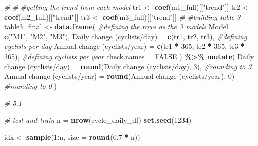 \documentclass[
]{article}
\newenvironment{Shaded}{\begin{snugshade}}{\end{snugshade}}
\newcommand{\AttributeTok}[1]{\textcolor[rgb]{0.13,0.29,0.53}{#1}}
\newcommand{\CommentTok}[1]{\textcolor[rgb]{0.56,0.35,0.01}{\textit{#1}}}
\newcommand{\ConstantTok}[1]{\textcolor[rgb]{0.56,0.35,0.01}{#1}}
\newcommand{\DecValTok}[1]{\textcolor[rgb]{0.00,0.00,0.81}{#1}}
\newcommand{\FloatTok}[1]{\textcolor[rgb]{0.00,0.00,0.81}{#1}}
\newcommand{\FunctionTok}[1]{\textcolor[rgb]{0.13,0.29,0.53}{\textbf{#1}}}
\newcommand{\NormalTok}[1]{#1}
\newcommand{\OtherTok}[1]{\textcolor[rgb]{0.56,0.35,0.01}{#1}}
\newcommand{\SpecialCharTok}[1]{\textcolor[rgb]{0.81,0.36,0.00}{\textbf{#1}}}
\newcommand{\StringTok}[1]{\textcolor[rgb]{0.31,0.60,0.02}{#1}}
\begin{document}
\begin{Shaded}
\begin{Highlighting}[]
\CommentTok{\# }
\CommentTok{\# \#getting the trend from each model}
\NormalTok{tr1 }\OtherTok{\textless{}{-}} \FunctionTok{coef}\NormalTok{(m1\_full)[[}\StringTok{"trend"}\NormalTok{]]}
\NormalTok{tr2 }\OtherTok{\textless{}{-}} \FunctionTok{coef}\NormalTok{(m2\_full)[[}\StringTok{"trend"}\NormalTok{]]}
\NormalTok{tr3 }\OtherTok{\textless{}{-}} \FunctionTok{coef}\NormalTok{(m3\_full)[[}\StringTok{"trend"}\NormalTok{]]}
\CommentTok{\# }
\CommentTok{\#building table 3}
\NormalTok{table3\_final }\OtherTok{\textless{}{-}} \FunctionTok{data.frame}\NormalTok{(}
  \CommentTok{\#defining the rows as the 3 models}
  \AttributeTok{Model =} \FunctionTok{c}\NormalTok{(}\StringTok{"M1"}\NormalTok{, }\StringTok{"M2"}\NormalTok{, }\StringTok{"M3"}\NormalTok{),}
  \StringTok{\textasciigrave{}}\AttributeTok{Daily change (cyclists/day)}\StringTok{\textasciigrave{}} \OtherTok{=} \FunctionTok{c}\NormalTok{(tr1, tr2, tr3), }\CommentTok{\#defining cyclists per day}
  \StringTok{\textasciigrave{}}\AttributeTok{Annual change (cyclists/year)}\StringTok{\textasciigrave{}} \OtherTok{=} \FunctionTok{c}\NormalTok{(tr1 }\SpecialCharTok{*} \DecValTok{365}\NormalTok{, tr2 }\SpecialCharTok{*} \DecValTok{365}\NormalTok{, tr3 }\SpecialCharTok{*} \DecValTok{365}\NormalTok{), }\CommentTok{\#defining cyclists per year}
  \AttributeTok{check.names =} \ConstantTok{FALSE}
\NormalTok{) }\SpecialCharTok{\%\textgreater{}\%}
  \FunctionTok{mutate}\NormalTok{(}
    \StringTok{\textasciigrave{}}\AttributeTok{Daily change (cyclists/day)}\StringTok{\textasciigrave{}} \OtherTok{=} \FunctionTok{round}\NormalTok{(}\StringTok{\textasciigrave{}}\AttributeTok{Daily change (cyclists/day)}\StringTok{\textasciigrave{}}\NormalTok{, }\DecValTok{3}\NormalTok{), }\CommentTok{\#rounding to 3}
    \StringTok{\textasciigrave{}}\AttributeTok{Annual change (cyclists/year)}\StringTok{\textasciigrave{}} \OtherTok{=} \FunctionTok{round}\NormalTok{(}\StringTok{\textasciigrave{}}\AttributeTok{Annual change (cyclists/year)}\StringTok{\textasciigrave{}}\NormalTok{, }\DecValTok{0}\NormalTok{) }\CommentTok{\#rounding to 0}
\NormalTok{  )}


\CommentTok{\# 5.1 }

\CommentTok{\# test and train}
\NormalTok{n }\OtherTok{=} \FunctionTok{nrow}\NormalTok{(cycle\_daily\_df)}
\FunctionTok{set.seed}\NormalTok{(}\DecValTok{1234}\NormalTok{)}

\NormalTok{idx }\OtherTok{\textless{}{-}} \FunctionTok{sample}\NormalTok{(}\DecValTok{1}\SpecialCharTok{:}\NormalTok{n, }\AttributeTok{size =} \FunctionTok{round}\NormalTok{(}\FloatTok{0.7} \SpecialCharTok{*}\NormalTok{ n))}


\end{Highlighting}
\end{Shaded}
\end{document}
